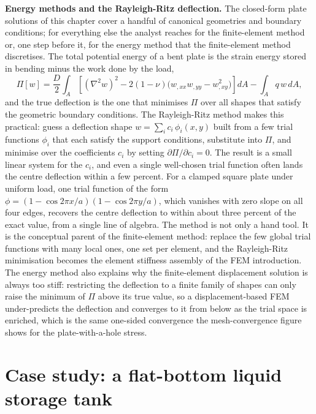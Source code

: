 \begin{mastery}
\textbf{Energy methods and the Rayleigh-Ritz deflection.} The closed-form
plate solutions of this chapter cover a handful of canonical geometries and
boundary conditions; for everything else the analyst reaches for the
finite-element method or, one step before it, for the energy method that the
finite-element method discretises. The total potential energy of a bent
plate is the strain energy stored in bending minus the work done by the
load,
\[
\Pi[w] = \frac{D}{2}\!\int_A\!\left[(\nabla^2 w)^2
- 2(1-\nu)\bigl(w_{,xx}w_{,yy} - w_{,xy}^2\bigr)\right]dA
- \int_A q\,w\,dA,
\]
and the true deflection is the one that minimises $\Pi$ over all shapes that
satisfy the geometric boundary conditions. The Rayleigh-Ritz method makes
this practical: guess a deflection shape $w = \sum_i c_i\,\phi_i(x,y)$ built
from a few trial functions $\phi_i$ that each satisfy the support
conditions, substitute into $\Pi$, and minimise over the coefficients $c_i$
by setting $\partial\Pi/\partial c_i = 0$. The result is a small linear
system for the $c_i$, and even a single well-chosen trial function often
lands the centre deflection within a few percent. For a clamped square plate
under uniform load, one trial function of the form $\phi = (1-\cos 2\pi
x/a)(1-\cos 2\pi y/a)$, which vanishes with zero slope on all four edges,
recovers the centre deflection to within about three percent of the exact
value, from a single line of algebra. The method is not only a hand tool. It
is the conceptual parent of the finite-element method: replace the few
global trial functions with many local ones, one set per element, and the
Rayleigh-Ritz minimisation becomes the element stiffness assembly of the FEM
introduction. The energy method also explains why the finite-element
displacement solution is always too stiff: restricting the deflection to a
finite family of shapes can only raise the minimum of $\Pi$ above its true
value, so a displacement-based FEM under-predicts the deflection and
converges to it from below as the trial space is enriched, which is the
same one-sided convergence the mesh-convergence figure shows for the
plate-with-a-hole stress.
\end{mastery}

\section{Case study: a flat-bottom liquid storage tank}

